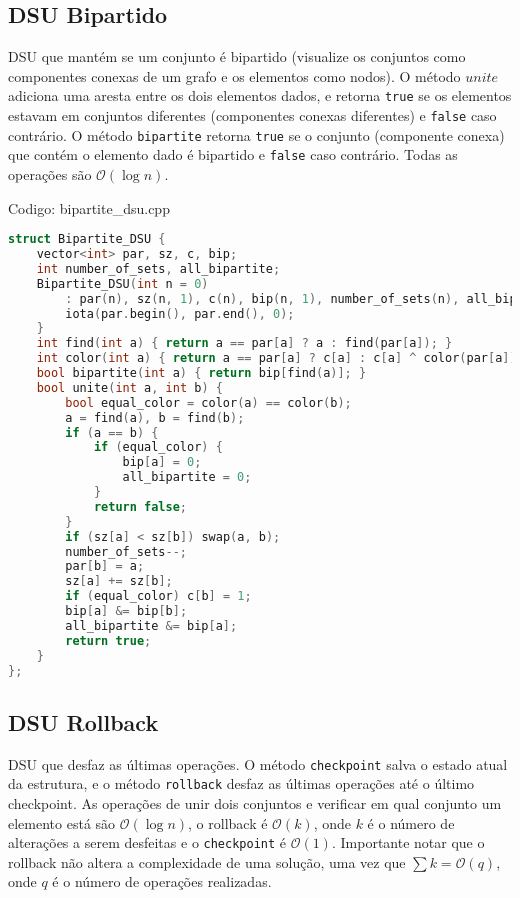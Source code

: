 \documentclass[10pt, a4paper, oneside]{book}
\begin{document}
\subsection{DSU Bipartido}


DSU que mantém se um conjunto é bipartido (visualize os conjuntos como componentes conexas de um grafo e os elementos como nodos). O método $unite$ adiciona uma aresta entre os dois elementos dados, e retorna \texttt{true} se os elementos estavam em conjuntos diferentes (componentes conexas diferentes) e \texttt{false} caso contrário. O método \texttt{bipartite} retorna \texttt{true} se o conjunto (componente conexa) que contém o elemento dado é bipartido e \texttt{false} caso contrário. Todas as operações são $\mathcal{O}(\log n)$.

\hfill

Codigo: bipartite\_dsu.cpp

\begin{lstlisting}[language=C++]
struct Bipartite_DSU {
    vector<int> par, sz, c, bip;
    int number_of_sets, all_bipartite;
    Bipartite_DSU(int n = 0)
        : par(n), sz(n, 1), c(n), bip(n, 1), number_of_sets(n), all_bipartite(1) {
        iota(par.begin(), par.end(), 0);
    }
    int find(int a) { return a == par[a] ? a : find(par[a]); }
    int color(int a) { return a == par[a] ? c[a] : c[a] ^ color(par[a]); }
    bool bipartite(int a) { return bip[find(a)]; }
    bool unite(int a, int b) {
        bool equal_color = color(a) == color(b);
        a = find(a), b = find(b);
        if (a == b) {
            if (equal_color) {
                bip[a] = 0;
                all_bipartite = 0;
            }
            return false;
        }
        if (sz[a] < sz[b]) swap(a, b);
        number_of_sets--;
        par[b] = a;
        sz[a] += sz[b];
        if (equal_color) c[b] = 1;
        bip[a] &= bip[b];
        all_bipartite &= bip[a];
        return true;
    }
};
\end{lstlisting}
\hfill

\subsection{DSU Rollback}


DSU que desfaz as últimas operações. O método \texttt{checkpoint} salva o estado atual da estrutura, e o método \texttt{rollback} desfaz as últimas operações até o último checkpoint. As operações de unir dois conjuntos e verificar em qual conjunto um elemento está são $\mathcal{O}(\log n)$, o rollback é $\mathcal{O}(k)$, onde $k$ é o número de alterações a serem desfeitas e o \texttt{checkpoint} é $\mathcal{O}(1)$. Importante notar que o rollback não altera a complexidade de uma solução, uma vez que $\sum k = \mathcal{O}(q)$, onde $q$ é o número de operações realizadas.
\end{document}
